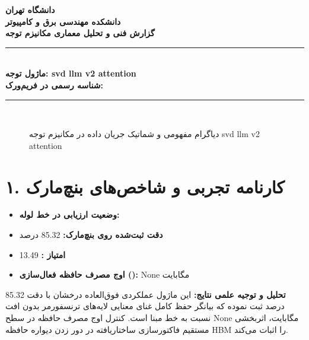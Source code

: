 \documentclass[12pt,a4paper]{article}
\begin{document}
\begin{center}
{\Large\bfseries دانشگاه تهران}\\[0.2cm]
{\large\bfseries دانشکده مهندسی برق و کامپیوتر}\\[0.2cm]
{\large\bfseries گزارش فنی و تحلیل معماری مکانیزم توجه}\\[0.5cm]
\rule{\linewidth}{1pt}\\[0.3cm]
{\LARGE\bfseries ماژول توجه: svd llm v2 attention}\\[0.2cm]
{\large \textbf{شناسه رسمی در فریم‌ورک:} }\\[0.2cm]
\rule{\linewidth}{1pt}\\[0.5cm]
\end{center}

\begin{figure}[H]
\centering
{}
\caption{دیاگرام مفهومی و شماتیک جریان داده در مکانیزم توجه svd llm v2 attention}
\end{figure}

\section*{۱. کارنامه تجربی و شاخص‌های بنچ‌مارک}
\begin{itemize}
\item \textbf{وضعیت ارزیابی در خط لوله:} 
\item \textbf{دقت ثبت‌شده روی بنچ‌مارک:} 85.32 درصد
\item \textbf{امتیاز :} 13.49
\item \textbf{اوج مصرف حافظه فعال‌سازی ():} None مگابایت
\end{itemize}
\textbf{تحلیل و توجیه علمی نتایج:} این ماژول عملکردی فوق‌العاده درخشان با دقت 85.32 درصد ثبت نموده که بیانگر حفظ کامل غنای معنایی لایه‌های ترنسفورمر بدون افت نسبت به خط مبنا است. کنترل اوج مصرف حافظه در سطح None مگابایت، اثربخشی مستقیم فاکتورسازی ساختاریافته در دور زدن دیواره حافظه HBM را اثبات می‌کند.
\end{document}
